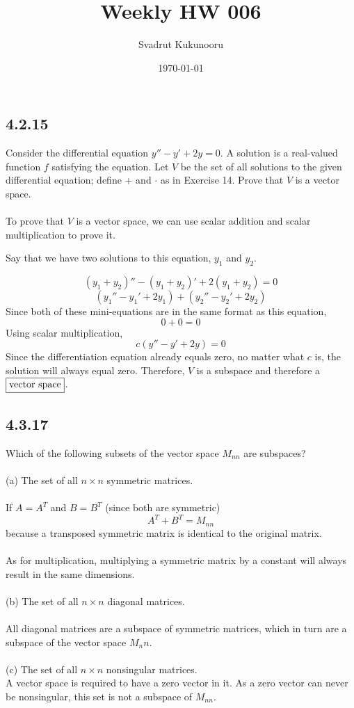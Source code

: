 \documentclass[letterpaper]{report}
\title{Weekly HW 006}
\author{Svadrut Kukunooru}
\date{\today}
\begin{document}
\begin{titlepage}
    \maketitle
\end{titlepage}
   \subsection{4.2.15}%
   \label{sub:4.2.15}
   Consider the differential equation $y'' - y' + 2y = 0$. A solution is a real-valued function $f$ satisfying the equation. Let $V$ be the set of all solutions to the given differential equation; define + and $\cdot$ as in Exercise 14. Prove that $V$ is a vector space.  \\ \\ 

To prove that $V$ is a vector space, we can use scalar addition and scalar multiplication to prove it. 

Say that we have two solutions to this equation, $y_1$ and $y_2$. 

\[
    (y_1 + y_2)'' - (y_1 + y_2)' + 2(y_1 + y_2) = 0
\] 
\[
    (y_1'' - y_1' + 2y_1) + (y_2'' - y_2' + 2y_2)
\] 
Since both of these mini-equations are in the same format as this equation, 
\[
0 + 0 = 0
\] 
Using scalar multiplication, 
\[
    c(y'' - y' + 2y) = 0
\] 
Since the differentiation equation already equals zero, no matter what $c$ is, the solution will always equal zero. Therefore, $V$ is a subspace and therefore a $\fbox{vector space}$.
\subsection{4.3.17}%
\label{sub:4.3.17}
Which of the following subsets of the vector space $M_{nn}$ are subspaces? \\ \\ 
(a) The set of all $n \times n$ symmetric matrices.  \\ \\ 
If $A = A^T$ and $B = B^T$ (since both are symmetric)
\[
    A^T + B^T = M_{nn}
\]
because a transposed symmetric matrix is identical to the original matrix. 
\\ \\ 
As for multiplication, multiplying a symmetric matrix by a constant will always result in the same dimensions. 
\\ \\ 
(b) The set of all $n \times  n$ diagonal matrices. \\  \\ 
All diagonal matrices are a subspace of symmetric matrices, which in turn are a subspace of the vector space $M_nn$.  \\ \\ 
(c) The set of all $n \times n$ nonsingular matrices. \\
A vector space is required to have a zero vector in it. As a zero vector can never be nonsingular, this set is not a subspace of $M_{nn}$. 
\end{document}
